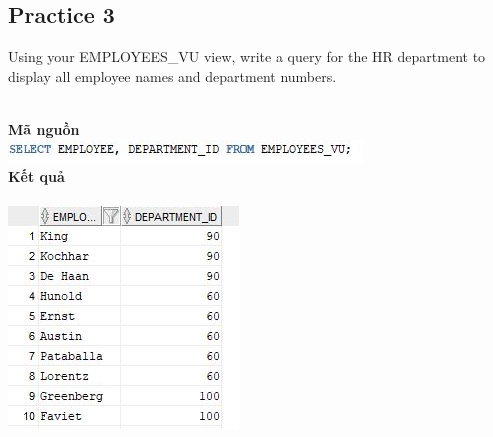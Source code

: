 \documentclass[12pt,a4paper]{report}
\begin{document}
\subsection{Practice 3}
\begin{boxedminipage}[t]{15.5cm}
	Using your EMPLOYEES\_VU view, write a query for the HR department to display all employee names and department numbers.
\end{boxedminipage}
\newline
\\
\textbf{Mã nguồn}
\\
\newline
\includegraphics[scale=1]{p33.jpg}\\
\textbf{Kết quả}\\\\
\includegraphics[scale=1]{kp33.jpg}
\end{document}
